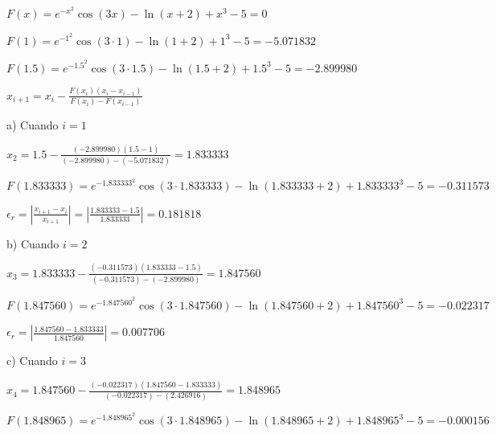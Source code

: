 \documentclass[12pt]{article}
\begin{document}
\begin{center}
\begin{figure}[h]
\end{figure}

$F(x)=e^{-x^2}\cos(3x)-\ln(x+2)+x^3-5=0$

$F(1)=e^{-1^2}\cos(3\cdot1)-\ln(1+2)+1^3-5=-5.071832$

$F(1.5)=e^{-1.5^2}\cos(3\cdot1.5)-\ln(1.5+2)+1.5^3-5=-2.899980$

$x_{i+1}=x_i-\frac{F(x_i)(x_i-x_{i-1})}{F(x_i)-F(x_{i-1})}$

\vspace{0.5cm}

a) Cuando $i=1$

$x_2=1.5-\frac{(-2.899980)(1.5-1)}{(-2.899980)-(-5.071832)}=1.833333$

$F(1.833333)=e^{-1.833333^2}\cos(3\cdot1.833333)-\ln(1.833333+2)+1.833333^3-5=-0.311573$

$\epsilon_r=\left|\frac{x_{i+1}-x_i}{x_{i+1}}\right|=\left|\frac{1.833333-1.5}{1.833333}\right|=0.181818$

\vspace{0.5cm}

b) Cuando $i=2$

$x_3=1.833333-\frac{(-0.311573)(1.833333-1.5)}{(-0.311573)-(-2.899980)}=1.847560$

$F(1.847560)=e^{-1.847560^2}\cos(3\cdot1.847560)-\ln(1.847560+2)+1.847560^3-5=-0.022317$

$\epsilon_r=\left|\frac{1.847560-1.833333}{1.847560}\right|=0.007706$

\vspace{0.5cm}

c) Cuando $i=3$

$x_4=1.847560-\frac{(-0.022317)(1.847560-1.833333)}{(-0.022317)-(2.426916)}=1.848965$

$F(1.848965)=e^{-1.848965^2}\cos(3\cdot1.848965)-\ln(1.848965+2)+1.848965^3-5=-0.000156$


\end{center}
\end{document}
